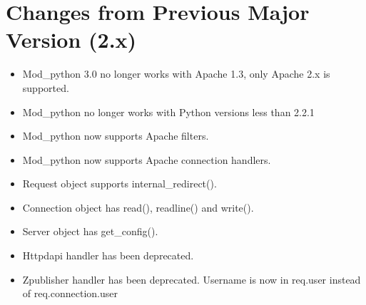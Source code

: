 \chapter{Changes from Previous Major Version (2.x)\label{app-changes}}


\begin{itemize}

\item
Mod_python 3.0 no longer works with Apache 1.3, only Apache 2.x is
supported.
\item
Mod_python no longer works with Python versions less than 2.2.1
\item 
Mod_python now supports Apache filters.
\item 
Mod_python now supports Apache connection handlers.
\item 
Request object supports internal_redirect().
\item
Connection object has read(), readline() and write().
\item
Server object has get_config().
\item
{} 
Httpdapi handler has been deprecated.
\item
{}
Zpublisher handler has been deprecated.
\tem
Username is now in req.user instead of req.connection.user

\end{itemize}
